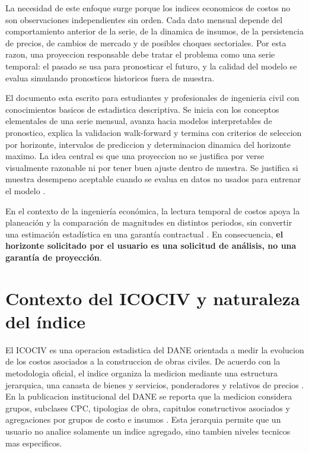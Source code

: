 ﻿\documentclass[12pt,letterpaper]{article}
\newcommand{\ICOCIV}{ICOCIV}
\begin{document}
La necesidad de este enfoque surge porque los indices economicos de costos no son observaciones independientes sin orden. Cada dato mensual depende del comportamiento anterior de la serie, de la dinamica de insumos, de la persistencia de precios, de cambios de mercado y de posibles choques sectoriales. Por esta razon, una proyeccion responsable debe tratar el problema como una serie temporal: el pasado se usa para pronosticar el futuro, y la calidad del modelo se evalua simulando pronosticos historicos fuera de muestra.

El documento esta escrito para estudiantes y profesionales de ingenieria civil con conocimientos basicos de estadistica descriptiva. Se inicia con los conceptos elementales de una serie mensual, avanza hacia modelos interpretables de pronostico, explica la validacion walk-forward y termina con criterios de seleccion por horizonte, intervalos de prediccion y determinacion dinamica del horizonte maximo. La idea central es que una proyeccion no se justifica por verse visualmente razonable ni por tener buen ajuste dentro de muestra. Se justifica si muestra desempeno aceptable cuando se evalua en datos no usados para entrenar el modelo \citep{tashman2000,hyndman2021fpp3}.

En el contexto de la ingeniería económica, la lectura temporal de costos apoya la planeación y la comparación de magnitudes en distintos periodos, sin convertir una estimación estadística en una garantía contractual \citep{mcgraw_dieter_tvm_2021}. En consecuencia, \textbf{el horizonte solicitado por el usuario es una solicitud de análisis, no una garantía de proyección}.

\section{Contexto del ICOCIV y naturaleza del índice}

El \ICOCIV{} es una operacion estadistica del DANE orientada a medir la evolucion de los costos asociados a la construccion de obras civiles. De acuerdo con la metodologia oficial, el indice organiza la medicion mediante una estructura jerarquica, una canasta de bienes y servicios, ponderadores y relativos de precios \citep{dane2021metodologia}. En la publicacion institucional del DANE se reporta que la medicion considera grupos, subclases CPC, tipologias de obra, capitulos constructivos asociados y agregaciones por grupos de costo e insumos \citep{dane_icociv_web}. Esta jerarquia permite que un usuario no analice solamente un indice agregado, sino tambien niveles tecnicos mas especificos.
\end{document}
